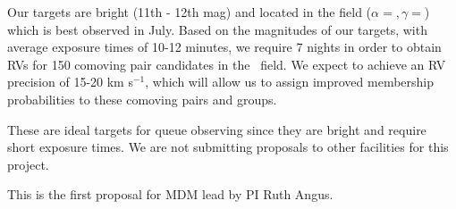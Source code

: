 \feasibility

Our targets are bright (11th - 12th mag) and located in the \kepler field
($\alpha = , \gamma = $) which is best observed in July.
Based on the magnitudes of our targets, with average exposure times of 10-12
minutes, we require 7 nights in order to obtain RVs for 150 comoving pair
candidates in the \kepler\ field.
We expect to achieve an RV precision of 15-20 km s$^{-1}$, which will allow us
to assign improved membership probabilities to these comoving pairs and
groups.

%
%

\whymdm
These are ideal targets for queue observing since they are bright and require
short exposure times.
We are not submitting proposals to other facilities for this project.

%

\thepast
This is the first proposal for MDM lead by PI Ruth Angus.


